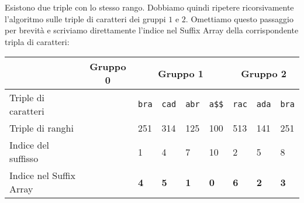 Esistono due triple con lo stesso rango. Dobbiamo quindi ripetere ricorsivamente
l'algoritmo \dc sulle triple di caratteri dei gruppi \(1\) e \(2\). Omettiamo
questo passaggio per brevit\`a e scriviamo direttamente l'indice nel Suffix Array
della corrispondente tripla di caratteri:
\begin{table}[h]
  \begin{tabularx}{\linewidth}{l*{11}{X}}
                        & \multicolumn{4}{c}{Gruppo 0 \cellcolor{green} } 
                        & \multicolumn{4}{c}{Gruppo 1 \cellcolor{red} } 
                        & \multicolumn{3}{c}{Gruppo 2 \cellcolor{yellow} }\\
    \hline
    Triple di caratteri & \multicolumn{4}{c}{\cellcolor{gray!25}}
                        & \texttt{bra} & \texttt{cad} & \texttt{abr} & \texttt{a\$\$}
                        & \texttt{rac} & \texttt{ada} & \texttt{bra} \\
    Triple di ranghi    & \multicolumn{4}{c}{\cellcolor{gray!25}}
                        & 251 & 314 & 125 & 100
                        & 513 & 141 & 251 \\
    Indice del suffisso & \multicolumn{4}{c}{\cellcolor{gray!25}}
                        & 1 & 4 & 7 & 10
                        & 2 & 5 & 8 \\
    Indice nel Suffix Array & \multicolumn{4}{c}{\cellcolor{gray!25}}
                        & \textbf{4} & \textbf{5} & \textbf{1} & \textbf{0}
                        & \textbf{6} & \textbf{2} & \textbf{3} \\
  \end{tabularx}
\end{table}

